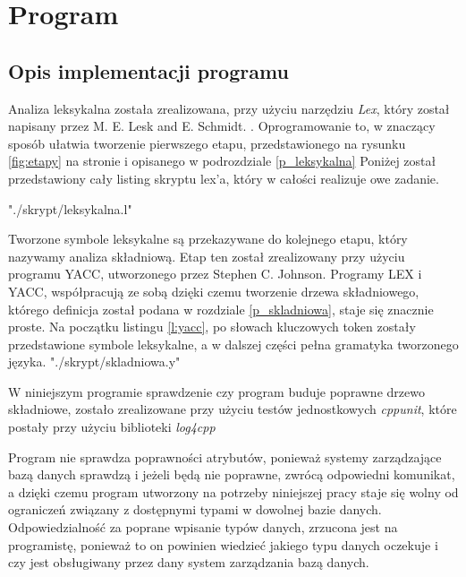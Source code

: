 \chapter{Program}

\section{Opis implementacji programu}



Analiza leksykalna została zrealizowana, 
  przy użyciu narzędziu \textit{Lex},
  który został napisany  przez M. E. Lesk and E. Schmidt. \cite{link_lex}.
Oprogramowanie to, w znaczący sposób ułatwia tworzenie pierwszego etapu,
 przedstawionego na rysunku \ref{fig:etapy} na stronie \pageref{fig:etapy} 
 i opisanego  w podrozdziale \ref{p_leksykalna}
Poniżej został przedstawiony cały listing skryptu lex'a,
 który w całości realizuje owe zadanie.

 {"./skrypt/leksykalna.l"}


Tworzone symbole leksykalne są przekazywane do kolejnego etapu,
 który nazywamy analiza składniową. 
Etap ten został zrealizowany przy użyciu programu YACC,
 utworzonego przez Stephen C. Johnson.
Programy LEX i YACC, współpracują ze sobą dzięki czemu tworzenie drzewa składniowego,
 którego definicja został podana w rozdziale \ref{p_skladniowa}, 
 staje się znacznie proste.
Na początku listingu  \ref{l:yacc},
 po słowach kluczowych token zostały przedstawione symbole leksykalne,
a w dalszej części pełna gramatyka tworzonego języka.
 {"./skrypt/skladniowa.y"}  


W niniejszym programie sprawdzenie czy program buduje poprawne drzewo składniowe,
 zostało zrealizowane przy użyciu testów jednostkowych \textit{cppunit}, 
 które postały przy użyciu biblioteki \textit{log4cpp}

Program nie sprawdza poprawności atrybutów, ponieważ systemy zarządzające bazą danych sprawdzą 
 i jeżeli będą nie poprawne,
 zwrócą odpowiedni komunikat,
 a dzięki czemu program utworzony na potrzeby niniejszej pracy staje się wolny od ograniczeń związany 
 z dostępnymi typami w dowolnej bazie danych.
Odpowiedzialność za poprane wpisanie typów danych, 
 zrzucona jest na programistę,
 ponieważ to on powinien wiedzieć jakiego typu danych oczekuje 
 i czy jest obsługiwany przez dany system zarządzania bazą danych.


